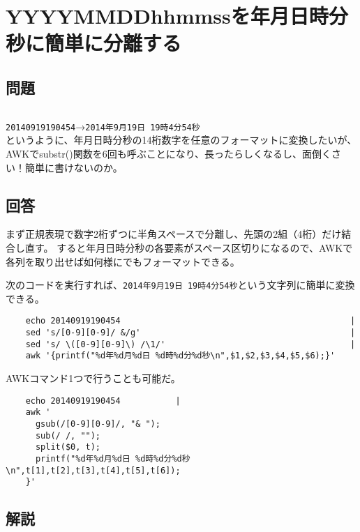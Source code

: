 \section{YYYYMMDDhhmmssを年月日時分秒に簡単に分離する}

\subsection*{問題}
\noindent
$\!\!\!\!\!$
\begin{grshfboxit}{160.0mm}
	\verb|20140919190454|→\verb|2014年9月19日 19時4分54秒| \\
	というように、年月日時分秒の14桁数字を任意のフォーマットに変換したいが、
	AWKでsubstr()関数を6回も呼ぶことになり、長ったらしくなるし、面倒くさい！簡単に書けないのか。
\end{grshfboxit}

\subsection*{回答}
まず正規表現で数字2桁ずつに半角スペースで分離し、先頭の2組（4桁）だけ結合し直す。
すると年月日時分秒の各要素がスペース区切りになるので、AWKで各列を取り出せば如何様にでもフォーマットできる。

次のコードを実行すれば、\verb|2014年9月19日 19時4分54秒|という文字列に簡単に変換できる。\\
\begin{frameboxit}{160.0mm}
\begin{verbatim}
	echo 20140919190454                                              |
	sed 's/[0-9][0-9]/ &/g'                                          |
	sed 's/ \([0-9][0-9]\) /\1/'                                     |
	awk '{printf("%d年%d月%d日 %d時%d分%d秒\n",$1,$2,$3,$4,$5,$6);}'
\end{verbatim}
\end{frameboxit}

AWKコマンド1つで行うことも可能だ。\\
\begin{frameboxit}{160.0mm}
\begin{verbatim}
	echo 20140919190454           |
	awk '
	  gsub(/[0-9][0-9]/, "& ");
	  sub(/ /, "");
	  split($0, t);
	  printf("%d年%d月%d日 %d時%d分%d秒\n",t[1],t[2],t[3],t[4],t[5],t[6]);
	}'
\end{verbatim}
\end{frameboxit}

\subsection*{解説}

